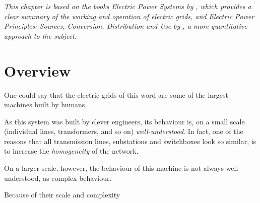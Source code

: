 \documentclass[main.tex]{subfiles}
\begin{document}





\emph{This chapter is based on the books \emph{Electric Power Systems} by \cite{VonMeier2006}, which provides a clear summary of the working and operation of electric grids, and \emph{Electric Power Principles: Sources, Conversion, Distribution and Use} by \cite{Kirtley2010}, a more quantitative approach to the subject.}
\section{Overview}
One could say that the electric grids of this word are some of the largest machines built by humans. 

As this system was built by clever engineers, its behaviour is, on a small scale (individual lines, transformers, and so on) \emph{well-understood}. In fact, one of the reasons that all transmission lines, substations and switchboxes look so similar, is to increase the \emph{homogeneity} of the network.

On a larger scale, however, the behaviour of this machine is not always well understood, as complex behaviour.

Because of their scale and complexity

\end{document}
